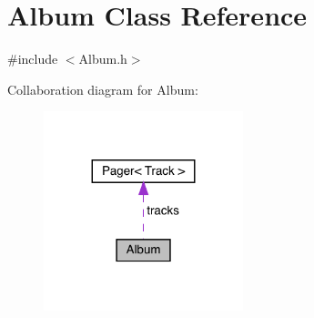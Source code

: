 \hypertarget{class_album}{}\section{Album Class Reference}
\label{class_album}


{\ttfamily \#include $<$Album.\+h$>$}



Collaboration diagram for Album\+:
\nopagebreak
\begin{figure}[H]
\begin{center}
\leavevmode
\includegraphics[width=164pt]{class_album__coll__graph}
\end{center}
\end{figure}
